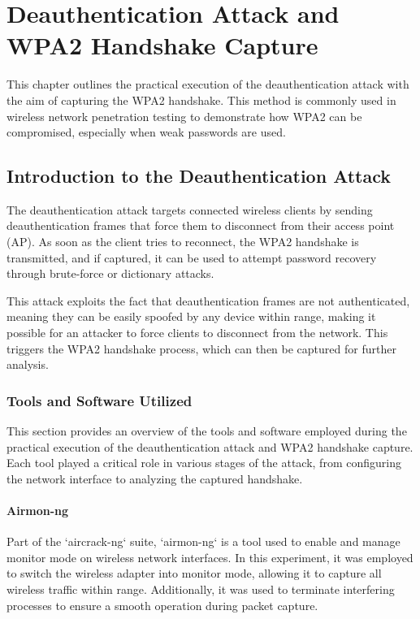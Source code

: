 \chapter{Deauthentication Attack and WPA2 Handshake Capture}

This chapter outlines the practical execution of the deauthentication attack with the aim of capturing the WPA2 handshake. This method is commonly used in wireless network penetration testing to demonstrate how WPA2 can be compromised, especially when weak passwords are used.

\section{Introduction to the Deauthentication Attack}
The deauthentication attack targets connected wireless clients by sending deauthentication frames that force them to disconnect from their access point (AP). As soon as the client tries to reconnect, the WPA2 handshake is transmitted, and if captured, it can be used to attempt password recovery through brute-force or dictionary attacks.

This attack exploits the fact that deauthentication frames are not authenticated, meaning they can be easily spoofed by any device within range, making it possible for an attacker to force clients to disconnect from the network. This triggers the WPA2 handshake process, which can then be captured for further analysis.

\subsection{Tools and Software Utilized}
This section provides an overview of the tools and software employed during the practical execution of the deauthentication attack and WPA2 handshake capture. Each tool played a critical role in various stages of the attack, from configuring the network interface to analyzing the captured handshake.

\subsubsection{Airmon-ng}
Part of the `aircrack-ng` suite, `airmon-ng` is a tool used to enable and manage monitor mode on wireless network interfaces. In this experiment, it was employed to switch the wireless adapter into monitor mode, allowing it to capture all wireless traffic within range. Additionally, it was used to terminate interfering processes to ensure a smooth operation during packet capture.

